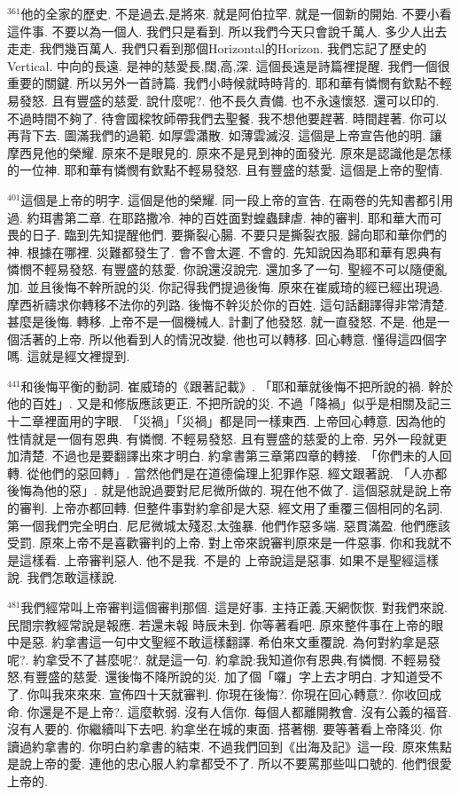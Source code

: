 \documentclass{book}
\begin{document}
$^{361}$他的全家的歷史.
不是過去,是將來.
就是阿伯拉罕.
就是一個新的開始.
不要小看這件事.
不要以為一個人.
我們只是看到.
所以我們今天只會說千萬人.
多少人出去走走.
我們幾百萬人.
我們只看到那個Horizontal的Horizon.
我們忘記了歷史的Vertical.
中向的長遠.
是神的慈愛長,闊,高,深.
這個長遠是詩篇裡提醒.
我們一個很重要的關鍵.
所以另外一首詩篇.
我們小時候就時時背的.
耶和華有憐憫有欽點不輕易發怒.
且有豐盛的慈愛.
說什麼呢?.
他不長久責備.
也不永遠懷怒.
還可以印的.
不過時間不夠了.
待會國樑牧師帶我們去聖餐.
我不想他要趕著.
時間趕著.
你可以再背下去.
圖滿我們的過範.
如厚雲瀟散.
如薄雲滅沒.
這個是上帝宣告他的明.
讓摩西見他的榮耀.
原來不是眼見的.
原來不是見到神的面發光.
原來是認識他是怎樣的一位神.
耶和華有憐憫有欽點不輕易發怒.
且有豐盛的慈愛.
這個是上帝的聖情.

$^{401}$這個是上帝的明字.
這個是他的榮耀.
同一段上帝的宣告.
在兩卷的先知書都引用過.
約珥書第二章.
在耶路撒冷.
神的百姓面對蝗蟲肆虐.
神的審判.
耶和華大而可畏的日子.
臨到先知提醒他們.
要撕裂心腸.
不要只是撕裂衣服.
歸向耶和華你們的神.
根據在哪裡.
災難都發生了.
會不會太遲.
不會的.
先知說因為耶和華有恩典有憐憫不輕易發怒.
有豐盛的慈愛.
你說還沒說完.
還加多了一句.
聖經不可以隨便亂加.
並且後悔不幹所說的災.
你記得我們提過後悔.
原來在崔威琦的經已經出現過.
摩西祈禱求你轉移不法你的列路.
後悔不幹災於你的百姓.
這句話翻譯得非常清楚.
甚麼是後悔.
轉移.
上帝不是一個機械人.
計劃了他發怒.
就一直發怒.
不是.
他是一個活著的上帝.
所以他看到人的情況改變.
他也可以轉移.
回心轉意.
懂得這四個字嗎.
這就是經文裡提到.

$^{441}$和後悔平衡的動詞.
崔威琦的《跟著記載》.
「耶和華就後悔不把所說的禍.
幹於他的百姓」.
又是和修版應該更正.
不把所說的災.
不過「降禍」似乎是相關及記三十二章裡面用的字眼.
「災禍」「災禍」都是同一樣東西.
上帝回心轉意.
因為他的性情就是一個有恩典.
有憐憫.
不輕易發怒.
且有豐盛的慈愛的上帝.
另外一段就更加清楚.
不過也是要翻譯出來才明白.
約拿書第三章第四章的轉接.
「你們未的人回轉.
從他們的惡回轉」.
當然他們是在道德倫理上犯罪作惡.
經文跟著說.
「人亦都後悔為他的惡」.
就是他說過要對尼尼微所做的.
現在他不做了.
這個惡就是說上帝的審判.
上帝亦都回轉.
但整件事對約拿卻是大惡.
經文用了重覆三個相同的名詞.
第一個我們完全明白.
尼尼微城太殘忍,太強暴.
他們作惡多端.
惡貫滿盈.
他們應該受罰.
原來上帝不是喜歡審判的上帝.
對上帝來說審判原來是一件惡事.
你和我就不是這樣看.
上帝審判惡人.
他不是我.
不是的 上帝說這是惡事.
如果不是聖經這樣說.
我們怎敢這樣說.

$^{481}$我們經常叫上帝審判這個審判那個.
這是好事.
主持正義,天網恢恢.
對我們來說.
民間宗教經常說是報應.
若還未報 時辰未到.
你等著看吧.
原來整件事在上帝的眼中是惡.
約拿書這一句中文聖經不敢這樣翻譯.
希伯來文重覆說.
為何對約拿是惡呢?.
約拿受不了甚麼呢?.
就是這一句.
約拿說:我知道你有恩典,有憐憫.
不輕易發怒,有豐盛的慈愛.
還後悔不降所說的災.
加了個「囉」字上去才明白.
才知道受不了.
你叫我來來來.
宣佈四十天就審判.
你現在後悔?.
你現在回心轉意?.
你收回成命.
你還是不是上帝?.
這麼軟弱.
沒有人信你.
每個人都離開教會.
沒有公義的福音.
沒有人要的.
你繼續叫下去吧.
約拿坐在城的東面.
搭著棚.
要等著看上帝降災.
你讀過約拿書的.
你明白約拿書的結束.
不過我們回到《出海及記》這一段.
原來焦點是說上帝的愛.
連他的忠心服人約拿都受不了.
所以不要罵那些叫口號的.
他們很愛上帝的.
\end{document}
